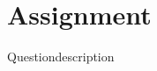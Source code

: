 \documentclass{article}
\newcommand{\assignment}{Assignment}
\begin{document}
\section*{\assignment}

\begin{question}{Question}{description}
\end{question}
\end{document}
